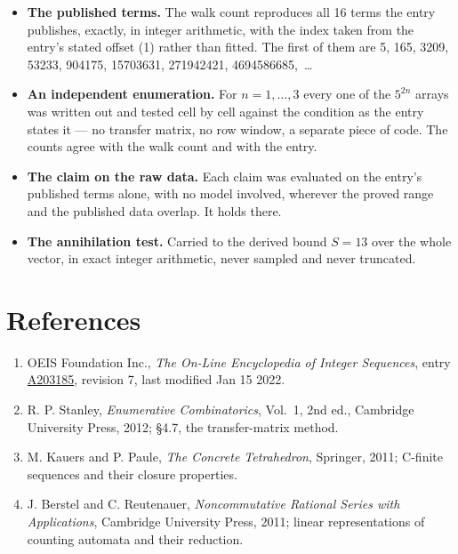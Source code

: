 \documentclass[11pt]{article}
\theoremstyle{definition}
\begin{document}
\begin{itemize}

\item {\bfseries The published terms.} The walk count reproduces all 16 terms the entry publishes, exactly, in integer arithmetic, with the index taken from the entry's stated offset (1) rather than fitted. The first of them are 5, 165, 3209, 53233, 904175, 15703631, 271942421, 4694586685,~\dots

\item {\bfseries An independent enumeration.} For $n = 1,\dots,3$ every one of the $5^{2n}$ arrays was written out and tested cell by cell against the condition as the entry states it --- no transfer matrix, no row window, a separate piece of code. The counts agree with the walk count and with the entry.

\item {\bfseries The claim on the raw data.} Each claim was evaluated on the entry's published terms alone, with no model involved, wherever the proved range and the published data overlap. It holds there.

\item {\bfseries The annihilation test.} Carried to the derived bound $S = 13$ over the whole vector, in exact integer arithmetic, never sampled and never truncated.

\end{itemize}

\section{References}

\begin{enumerate}

\item OEIS Foundation Inc., \emph{The On-Line Encyclopedia of Integer Sequences}, entry \href{https://oeis.org/A203185}{A203185}, revision 7, last modified Jan 15 2022.

\item R. P. Stanley, \emph{Enumerative Combinatorics}, Vol.~1, 2nd ed., Cambridge University Press, 2012; \S4.7, the transfer-matrix method.

\item M. Kauers and P. Paule, \emph{The Concrete Tetrahedron}, Springer, 2011; C-finite sequences and their closure properties.

\item J. Berstel and C. Reutenauer, \emph{Noncommutative Rational Series with Applications}, Cambridge University Press, 2011; linear representations of counting automata and their reduction.

\end{enumerate}
\end{document}
